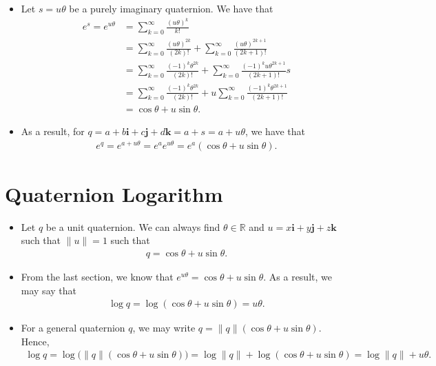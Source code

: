 \documentclass[10pt]{article}
\newcommand{\ve}[1]{\mathbf{#1}}
\newcommand{\Real}{\mathbb{R}}
\begin{document}
\begin{itemize}
    \item Let $s = u\theta$ be a purely imaginary quaternion. We have that
    \begin{align*}
        e^s = e^{u\theta}
        &= \sum_{k=0}^\infty \frac{(u\theta)^k}{k!} \\
        &= \sum_{k=0}^\infty \frac{(u\theta)^{2k}}{(2k)!} + \sum_{k=0}^\infty \frac{(u\theta)^{2k+1}}{(2k+1)!} \\
        &= \sum_{k=0}^\infty \frac{(-1)^k \theta^{2k}}{(2k)!} + \sum_{k=0}^\infty \frac{(-1)^k u \theta^{2k+1}}{(2k+1)!} s \\
        &= \sum_{k=0}^\infty \frac{(-1)^k \theta^{2k}}{(2k)!} + u \sum_{k=0}^\infty \frac{(-1)^k \theta^{2k+1}}{(2k+1)!}  \\
        &= \cos \theta + u \sin \theta.
    \end{align*}

    \item As a result, for $q = a + b\ve{i} + c\ve{j} + d\ve{k} = a + s = a + u\theta$, we have that
    \begin{align*}
        e^q = e^{a+u\theta} = e^a e^{u\theta} = e^a \left( \cos \theta + u \sin \theta \right).
    \end{align*}
\end{itemize}

\section{Quaternion Logarithm}

\begin{itemize}
    \item Let $q$ be a unit quaternion. We can always find $\theta \in \Real$ and $u = x\ve{i} + y\ve{j} + z\ve{k}$ such that $\| u \| = 1$ such that
    \begin{align*}
        q = \cos\theta + u \sin\theta.
    \end{align*}

    \item From the last section, we know that $e^{u\theta} = \cos\theta + u \sin\theta$. As a result, we may say that
    \begin{align*}
        \log q = \log (\cos \theta + u \sin \theta) = u\theta.
    \end{align*}

    \item For a general quaternion $q$, we may write $q = \|q\| (\cos \theta + u \sin \theta)$. Hence,
    \begin{align*}
        \log q = \log \big( \|q\| (\cos \theta + u \sin \theta) \big) = \log \|q\| + \log (\cos \theta + u \sin \theta) = \log \|q\| + u\theta.
    \end{align*}
\end{itemize}
\end{document}
